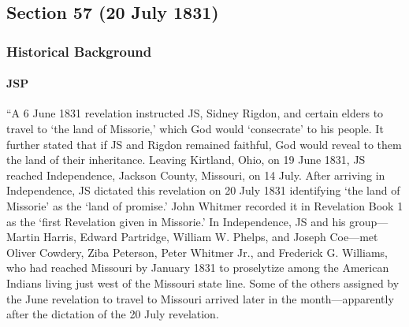 \subsection{Section 57 (20 July 1831)}
	\label{DC57}
	
	\subsubsection{Historical Background}
		\label{DC57-HB}
		
		\paragraph{JSP}
		
			``A 6 June 1831 revelation instructed JS, Sidney Rigdon, and certain elders to travel to `the land of Missorie,' which God would `consecrate' to his people. It further stated that if JS and Rigdon remained faithful, God would reveal to them the land of their inheritance. Leaving Kirtland, Ohio, on 19 June 1831, JS reached Independence, Jackson County, Missouri, on 14 July. After arriving in Independence, JS dictated this revelation on 20 July 1831 identifying `the land of Missorie' as the `land of promise.' John Whitmer recorded it in Revelation Book 1 as the `first Revelation given in Missorie.' In Independence, JS and his group---Martin Harris, Edward Partridge, William W. Phelps, and Joseph Coe---met Oliver Cowdery, Ziba Peterson, Peter Whitmer Jr., and Frederick G. Williams, who had reached Missouri by January 1831 to proselytize among the American Indians living just west of the Missouri state line. Some of the others assigned by the  June revelation to travel to Missouri arrived later in the month---apparently after the dictation of the 20 July revelation.
			
